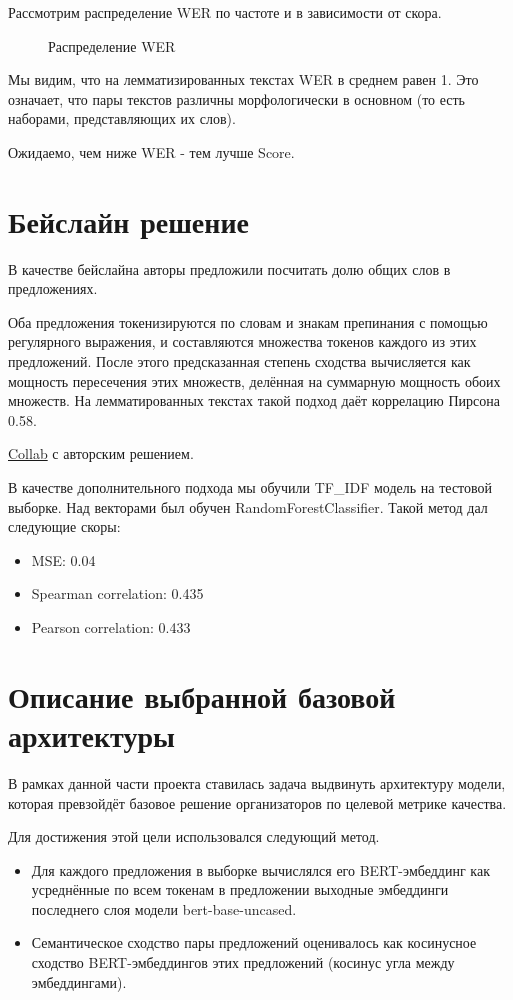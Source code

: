 \documentclass[12pt]{article}
\newcommand{\imgh}[3]
{
\begin{figure}[h]
\center{\texttt{[image: \#2]}}
\caption{#3}
\label{ris:#2}
\end{figure}
}
\begin{document}
Рассмотрим распределение WER по частоте и в зависимости от скора. 

\imgh{17cm}{wer_distribution.png}{Распределение WER}

Мы видим, что на лемматизированных текстах WER в среднем равен 1. Это означает, что пары текстов различны морфологически в основном (то есть наборами, представляющих их слов).

Ожидаемо, чем ниже WER - тем лучше Score.
\newpage

\section{Бейслайн решение}

В качестве бейслайна авторы предложили посчитать долю общих слов в предложениях.

Оба предложения токенизируются по словам и знакам препинания с помощью регулярного выражения, и составляются множества токенов каждого из этих предложений. После этого предсказанная степень сходства вычисляется как мощность пересечения этих множеств, делённая на суммарную мощность обоих множеств.
На лемматированных текстах такой подход даёт коррелацию Пирсона 0.58.

\href{https://github.com/semantic-textual-relatedness/Semantic_Relatedness_SemEval2024/blob/main/STR_Baseline.ipynb}{Collab} с авторским решением.

В качестве дополнительного подхода мы обучили TF\_IDF модель на тестовой выборке. Над векторами был обучен RandomForestClassifier. Такой метод дал следующие скоры:
\begin{itemize}
    \item MSE: 0.04
    \item Spearman correlation: 0.435
    \item Pearson correlation: 0.433
\end{itemize}

\section{Описание выбранной базовой архитектуры}
В рамках данной части проекта ставилась задача выдвинуть архитектуру модели, которая превзойдёт базовое решение организаторов по целевой метрике качества.

Для достижения этой цели использовался следующий метод.
\begin{itemize}
    \item Для каждого предложения в выборке вычислялся его BERT-эмбеддинг как \\ усреднённые по всем токенам в предложении выходные эмбеддинги последнего слоя модели bert-base-uncased.

    \item Семантическое сходство пары предложений оценивалось как косинусное сходство BERT-эмбеддингов этих предложений (косинус угла между эмбеддингами).
\end{itemize}
\end{document}
